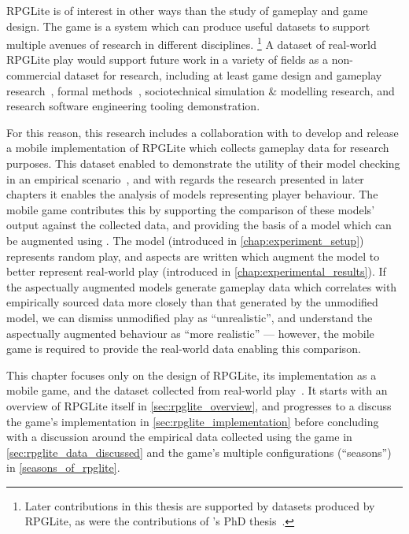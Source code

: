 RPGLite is of interest in other ways than the study of gameplay and game design.
The game is a \sociotechnical system which can produce useful datasets to
support multiple avenues of research in different disciplines.
\footnote{
Later contributions in this thesis are supported by datasets produced by
RPGLite, as were the contributions of \citeauthor{kavanagh2021thesis}'s PhD
thesis~\cite{kavanagh2021thesis}.
}
A dataset of real-world RPGLite play would support future work in a variety of
fields as a non-commercial dataset for research, including at least game design
and gameplay research~\cite{kavanagh2021thesis}, formal
methods~\cite{kavanagh2020}, sociotechnical simulation \& modelling research,
and research software engineering tooling demonstration.

For this reason, this research includes a collaboration with
\citeauthor{kavanagh2021thesis} to develop and release a mobile implementation
of RPGLite which collects gameplay data for research purposes. This dataset
enabled \citeauthor{kavanagh2021thesis} to demonstrate the utility of their
model checking in an empirical scenario~\cite{kavanagh2021thesis}, and with
regards the research presented in later chapters it enables the analysis of
models representing player behaviour. The mobile game contributes this by
supporting the comparison of these models' output against the collected data,
and providing the basis of a model which can be augmented using \aop{}. The
model (introduced in \cref{chap:experiment_setup}) represents random play, and
aspects are written which augment the model to better represent real-world play
(introduced in \cref{chap:experimental_results}). If the aspectually augmented
models generate gameplay data which correlates with empirically sourced data
more closely than that generated by the unmodified model, we can dismiss
unmodified play as ``unrealistic'', and understand the aspectually augmented
behaviour as ``more realistic'' --- however, the mobile game is required to
provide the real-world data enabling this comparison.

This chapter focuses only on the design of RPGLite, its implementation as a
mobile game, and the dataset collected from real-world
play~\cite{RPGLiteLessonsLearned}. It starts with an overview of RPGLite itself
in \cref{sec:rpglite_overview}, and progresses to a discuss the game's
implementation in \cref{sec:rpglite_implementation} before concluding with a
discussion around the empirical data collected using the game in
\cref{sec:rpglite_data_discussed} and the game's multiple configurations
(``seasons'') in \cref{seasons_of_rpglite}.

